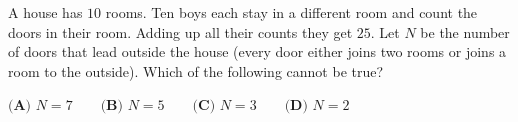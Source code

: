 A house has $10$ rooms. Ten boys each stay in a different room and count the doors in their room. Adding up all their counts they get $25$. Let $N$ be the number of doors that lead outside the house (every door either joins two rooms or joins a room to the outside). Which of the following cannot be true?

$\textbf{(A) }N=7\qquad\textbf{(B) }N=5\qquad\textbf{(C) }N=3\qquad\textbf{(D) }N=2$

